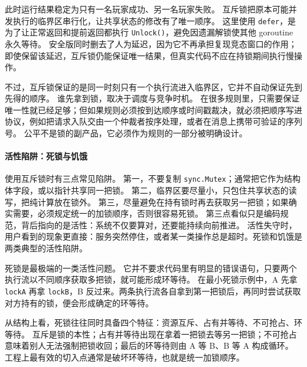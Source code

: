 此时运行结果稳定为只有一名玩家成功、另一名玩家失败。
互斥锁把原本可能并发执行的临界区串行化，让共享状态的修改有了唯一顺序。
这里使用 \texttt{defer}，是为了让正常返回和提前返回都执行 \texttt{Unlock()}，避免因遗漏解锁使其他 goroutine 永久等待。
安全版同时删去了人为延迟，因为它不再承担复现竞态窗口的作用；即使保留该延迟，互斥锁仍能保证唯一结果，但真实代码不应在持锁期间执行慢操作。

不过，互斥锁保证的是同一时刻只有一个执行流进入临界区，它并不自动保证先到先得的顺序。
谁先拿到锁，取决于调度与竞争时机。
在很多规则里，只需要保证唯一性就已经足够；但如果规则必须按到达顺序或时间戳裁决，就必须把顺序写进协议，例如把请求入队交由一个仲裁者按序处理，或者在消息上携带可验证的序列号。
公平不是锁的副产品，它必须作为规则的一部分被明确设计。

\paragraph{活性陷阱：死锁与饥饿}

使用互斥锁时有三点常见陷阱。
第一，不要复制 \texttt{sync.Mutex}；通常把它作为结构体字段，或以指针共享同一把锁。
第二，临界区要尽量小，只包住共享状态的读写，把纯计算放在锁外。
第三，尽量避免在持有锁时再去获取另一把锁；如果确实需要，必须规定统一的加锁顺序，否则很容易死锁。
第三点看似只是编码规范，背后指向的是活性：系统不仅要算对，还要能持续向前推进。
活性失守时，用户看到的现象更直接：服务突然停住，或者某一类操作总是超时。死锁和饥饿是两类典型的活性陷阱。

死锁是最极端的一类活性问题。
它并不要求代码里有明显的错误语句，只要两个执行流以不同顺序获取多把锁，就可能形成环等待。
在最小死锁示例中，A 先拿 \texttt{lockA} 再拿 \texttt{lockB}，B 反过来。两条执行流各自拿到第一把锁后，再同时尝试获取对方持有的锁，便会形成确定的环等待。

从结构上看，死锁往往同时具备四个特征：资源互斥、占有并等待、不可抢占、环等待。
互斥是锁的本性；占有并等待出现在拿着一把锁去等另一把锁；不可抢占意味着别人无法强制把锁收回；最后的环等待则由 A 等 B、B 等 A 构成循环。
工程上最有效的切入点通常是破坏环等待，也就是统一加锁顺序。


